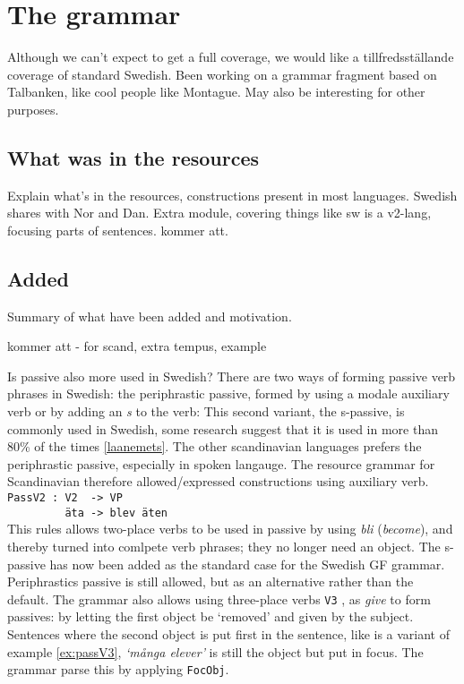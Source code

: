 \documentclass{report}
\begin{document}
\section{The grammar}
Although we can't expect to get a full coverage, we would like a tillfredsställande
coverage of standard Swedish. Been working on a grammar fragment based on Talbanken,
like cool people like Montague. May also be interesting for other purposes.
\subsection{What was in the resources}
Explain what's in the resources, constructions present in most languages. 
Swedish shares with Nor and Dan. Extra module, covering things like sw is a
v2-lang, focusing parts of sentences. 
kommer att.

\subsection{Added}
Summary of what have been added and motivation.

kommer att - for scand, extra tempus, example

Is passive also more used in Swedish?
There are two ways of forming passive verb phrases in Swedish: the 
periphrastic passive, formed by using a modale auxiliary verb 
or by adding an \emph{s} to
the verb:
This second variant, the s-passive, is commonly used in Swedish, some research
suggest that it is used in more than 80\% of the times \ref{laanemets}.
The other scandinavian languages prefers the periphrastic passive, especially in spoken langauge.
The resource grammar for Scandinavian therefore allowed/expressed constructions using auxiliary verb. \\
\verb|PassV2 : V2  -> VP | \\
\verb|         äta -> blev äten| \\
This rules allows two-place verbs to be used in passive by using \emph{bli} (\emph{become}), and thereby
turned into comlpete verb phrases; they no longer need an object.
The s-passive has now been added as the standard case for the Swedish GF
grammar. Periphrastics passive is still allowed, but as an alternative rather
than the default.
The grammar also allows using three-place verbs \verb|V3| , as \emph{give} to
form passives:
\label{ex:passV3}
by letting the first object be `removed' and given by the subject. 
Sentences where the second object is put first in the sentence, like 
is a variant of example \ref{ex:passV3}, \emph{`många elever'} is still the object but put in focus. The grammar
parse this by applying \verb|FocObj|.
\end{document}
